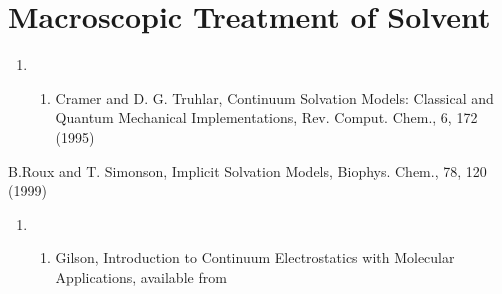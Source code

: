 \documentclass[letterpaper,11pt,english]{sphinxmanual}
\begin{document}
\section{Macroscopic Treatment of Solvent}
\label{\detokenize{text/references:macroscopic-treatment-of-solvent}}\begin{enumerate}
%
\setcounter{enumi}{2}
\item {} \begin{enumerate}
%
\setcounter{enumii}{9}
\item {} 
Cramer and D. G. Truhlar, Continuum Solvation Models: Classical and Quantum Mechanical Implementations, Rev. Comput. Chem., 6, 1\sphinxhyphen{}72 (1995)

\end{enumerate}

\end{enumerate}

B.Roux and T. Simonson, Implicit Solvation Models, Biophys. Chem., 78, 1\sphinxhyphen{}20 (1999)
\begin{enumerate}
%
\setcounter{enumi}{12}
\item {} \begin{enumerate}
%
\setcounter{enumii}{10}
\item {} 
Gilson, Introduction to Continuum Electrostatics with Molecular Applications, available from 

\end{enumerate}

\end{enumerate}
\end{document}
